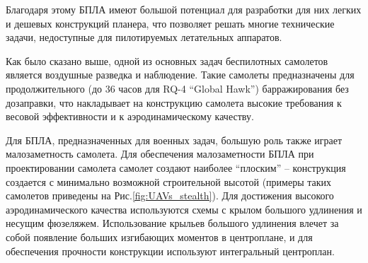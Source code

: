 

Благодаря этому БПЛА имеют большой потенциал для разработки для них легких и дешевых конструкций планера, что позволяет решать многие технические задачи, недоступные для пилотируемых летательных аппаратов.







Как было сказано выше, одной из основных задач беспилотных самолетов является воздушные разведка и наблюдение. Такие самолеты предназначены для продолжительного (до 36 часов для RQ-4 ``Global Hawk'') барражирования без дозаправки, что накладывает на конструкцию самолета высокие требования к весовой эффективности и к аэродинамическому качеству.




Для БПЛА, предназначенных для военных задач, большую роль также играет малозаметность самолета. Для обеспечения малозаметности БПЛА при проектировании самолета самолет создают наиболее ``плоским'' -- конструкция создается с минимально возможной строительной высотой (примеры таких самолетов приведены на Рис.\ref{fig:UAVs_stealth}). Для достижения высокого аэродинамического качества используются схемы с крылом большого удлинения и несущим фюзеляжем. Использование крыльев большого удлинения влечет за собой появление больших изгибающих моментов в центроплане, и для обеспечения прочности конструкции используют интегральный центроплан. 


